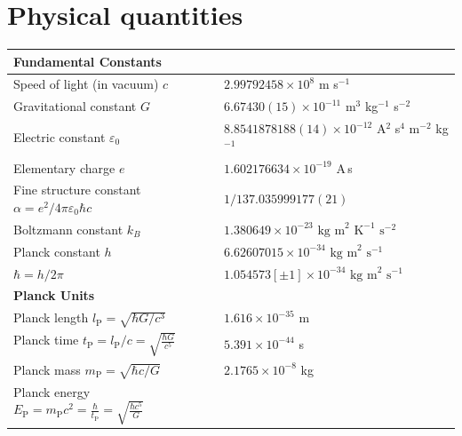 \chapter{Physical quantities}

\begin{table}[bth]
\centering
\begin{footnotesize}
\begin{tabular}{lll}
\hline
\multicolumn{3}{l}{\textbf{Fundamental Constants}} %
\\ \hline
	\multicolumn{2}{l}{Speed of light (in vacuum) $c$} 
		& $2.99792458 \times 10^{8}$ m s$^{-1}$
	\\
	\multicolumn{2}{l}{Gravitational constant $G$}
		& $6.67430(15) \times 10^{-11}$ m$^3$ kg$^{-1}$ s$^{-2}$
	\\
	\multicolumn{2}{l}{Electric constant $\varepsilon_0$}
		& $8.8541878188(14) \times 10^{-12}$ A$^2$ s$^4$ m$^{-2}$ kg$^{-1}$ %
	\\
	\multicolumn{2}{l}{Elementary charge $e$}
		& $1.602176634 \times 10^{-19}$ A\,s  
	\\
	\multicolumn{2}{l}{Fine structure constant $\alpha = e^2/4\pi\varepsilon_{0}\hbar c$}
		& $1/137.035999177(21)$
	\\
	\multicolumn{2}{l}{Boltzmann constant $k_B$}
		& $1.380649 \times 10^{-23}
	                     \mbox{ kg m}^2 \mbox{ K}^{-1} \mbox{ s}^{-2}$
	\\
	\multicolumn{2}{l}{Planck constant $h$}
		& $6.62607015 \times 10^{-34} 
	                 \mbox{ kg m}^2 \mbox{ s}^{-1}$ 
	\\
	\multicolumn{2}{l}{$\hbar = h/2\pi$}
		& $1.054573 [\pm 1] \times 
	                 10^{-34} \mbox{ kg m}^2 \mbox{ s}^{-1}$ 
	\\
	\hline
	\multicolumn{3}{l}{\textbf{Planck Units}} %
	\\ \hline
	\multicolumn{2}{l}{Planck length $l_\mathrm{P} = \sqrt{\hbar G/c^3}$}
		& $1.616 \times 10^{-35}$ m
	\\
	\multicolumn{2}{l}{Planck time $t_\mathrm{P} = l_\mathrm{P}/c = \displaystyle \sqrt{\frac{\hbar G}{c^5}}$}
		& $5.391 \times 10^{-44}$ s
	\\
	\multicolumn{2}{l}{Planck mass $m_\mathrm{P} = \sqrt{\hbar c/G}$}
		& $2.1765 \times 10^{-8}$ kg
	\\
	\multicolumn{2}{l}{Planck energy $E_\mathrm{P} = m_\mathrm{P} c^2 = \displaystyle \frac{\hbar}{t_\mathrm{P}} = \sqrt{\frac{\hbar c^5}{G}}$}

\end{tabular}
\end{footnotesize}
\end{table}
